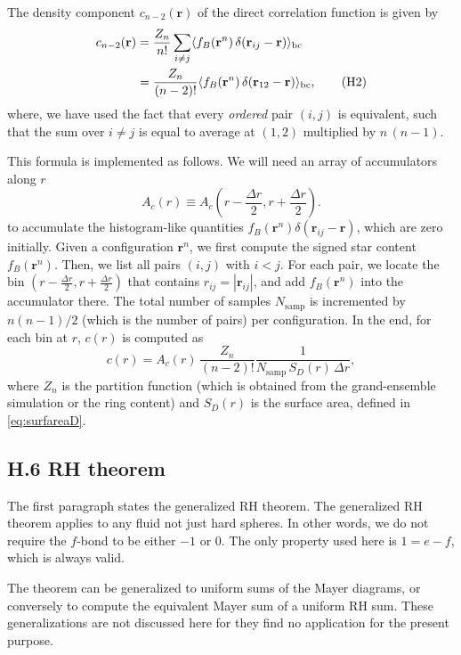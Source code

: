\documentclass[preprint]{revtex4-1}
\numberwithin{equation}{subsection}
\numberwithin{table}{section}
\newcommand{\vct}[1]{\mathbf{#1}}
\providecommand{\vr}{} %
\renewcommand{\vr}{\vct{r}}
\begin{document}
The density component $c_{n-2}(\vr)$ of the direct correlation function
is given by
\begin{align}
  c_{n-2}(\vr)
&=
  \frac { Z_n } { n! }
  \sum_{i \ne j}
  \langle
    f_B(\vr^n)
    \,
    \delta(\vr_{ij} - \vr)
  \rangle_{\mathrm{bc}}
\notag
\\
&=
  \frac { Z_n } { (n - 2)! }
  \langle
    f_B(\vr^n)
    \,
    \delta(\vr_{12} - \vr)
  \rangle_{\mathrm{bc}},
  \tag{H2}
  \label{eq:mayer_cr}
\end{align}
where, we have used the fact that
every \emph{ordered} pair $(i, j)$ is equivalent,
such that the sum over $i \ne j$
is equal to average at $(1, 2)$
multiplied by $n \, (n - 1)$.

This formula is implemented as follows.
%
We will need an array
of accumulators along $r$
\[
  A_c(r)
\equiv
  A_c\left(
    r - \frac { \Delta r } { 2 },
    r + \frac { \Delta r } { 2 }
  \right).
\]
to accumulate
the histogram-like quantities $f_B(\vr^n) \delta(\vr_{ij} - \vr)$,
which are zero initially.
%
Given a configuration $\vr^n$,
we first compute the signed star content $f_B(\vr^n)$.
%
Then,
we list all pairs $(i, j)$ with $i < j$.
%
For each pair,
we locate the bin $\left( r - \frac { \Delta r } { 2 }, r + \frac { \Delta r } { 2 } \right)$
that contains $r_{ij} = |\vr_{ij}|$,
and add $f_B(\vr^n)$ into the accumulator there.
%
The total number of samples $N_\mathrm{samp}$
is incremented by $n (n - 1) / 2$
(which is the number of pairs) per configuration.
%
In the end,
for each bin at $r$,
$c(r)$ is computed as
\[
  c(r)
=
  A_c(r) \,
  \frac{ Z_n } { (n - 2)! }
  \frac{ 1 } { N_\mathrm{samp} \, S_D(r) \, \Delta r },
\]
where
$Z_n$ is the partition function
(which is obtained from the grand-ensemble simulation or the ring content)
and
$S_D(r)$ is the surface area,
defined in \eqref{eq:surfareaD}.



\subsection{H.6 RH theorem}



The first paragraph states the generalized RH theorem.
%
The generalized RH theorem applies to any fluid
not just hard spheres.
%
In other words, we do not require the $f$-bond
to be either $-1$ or $0$.
%
The only property used here is $1 = e - f$,
which is always valid.

The theorem can be generalized to uniform sums of
the Mayer diagrams,
or conversely to compute the equivalent Mayer sum
of a uniform RH sum.
%
These generalizations are not discussed here
for they find no application for the present purpose.
\end{document}
